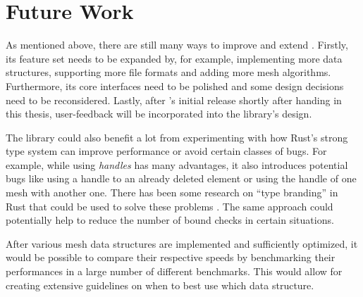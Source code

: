 \vspace{1cm}

\newpage
\section{Future Work}

As mentioned above, there are still many ways to improve and extend .
Firstly, its feature set needs to be expanded by, for example, implementing more data structures, supporting more file formats and adding more mesh algorithms.
Furthermore, its core interfaces need to be polished and some design decisions need to be reconsidered.
Lastly, after 's initial release shortly after handing in this thesis, user-feedback will be incorporated into the library's design.

The library could also benefit a lot from experimenting with how Rust's strong type system can improve performance or avoid certain classes of bugs.
For example, while using \emph{handles} has many advantages, it also introduces potential bugs like using a handle to an already deleted element or using the handle of one mesh with another one.
There has been some research on \enquote{type branding} in Rust that could be used to solve these problems \cite{beingessner2016you, indexing}.
The same approach could potentially help to reduce the number of bound checks in certain situations.

After various mesh data structures are implemented and sufficiently optimized, it would be possible to compare their respective speeds by benchmarking their performances in a large number of different benchmarks.
This would allow for creating extensive guidelines on when to best use which data structure.
